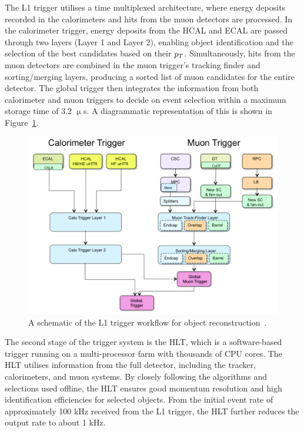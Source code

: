 The \ac{L1} trigger utilises a time multiplexed architecture, where energy deposits recorded in the calorimeters and hits from the muon detectors are processed. 
In the calorimeter trigger, energy deposits from the \ac{HCAL} and \ac{ECAL} are passed through two layers (Layer 1 and Layer 2), enabling object identification and the selection of the best candidates based on their $p_{T}$. 
Simultaneously, hits from the muon detectors are combined in the muon trigger's tracking finder and sorting/merging layers, producing a sorted list of muon candidates for the entire detector. 
The global trigger then integrates the information from both calorimeter and muon triggers to decide on event selection within a maximum storage time of 3.2 $\upmu$s.
A diagrammatic representation of this is shown in Figure~\ref{fig:trigger}. \\

\begin{figure}[!hbtp]
    \centering
    \includegraphics[width=\textwidth]{Figures/trigger.png}
    \caption[Diagram of the CMS L1 trigger workflow.]{A schematic of the L1 trigger workflow for object reconstruction~\cite{Tapper:2013yva}.}
    \label{fig:trigger}
\end{figure}

The second stage of the trigger system is the \ac{HLT}, which is a software-based trigger running on a multi-processor farm with thousands of CPU cores. 
The \ac{HLT} utilises information from the full detector, including the tracker, calorimeters, and muon systems. 
By closely following the algorithms and selections used offline, the \ac{HLT} ensures good momentum resolution and high identification efficiencies for selected objects. 
From the initial event rate of approximately 100 kHz received from the \ac{L1} trigger, the \ac{HLT} further reduces the output rate to about 1 kHz. \\

